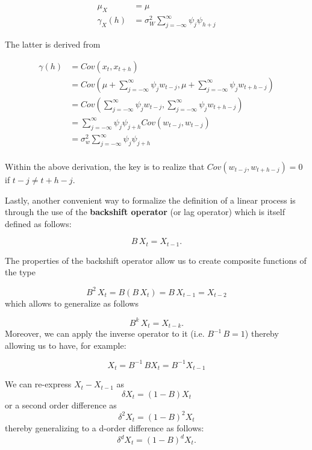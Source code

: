\documentclass[]{book}
\theoremstyle{definition}
\theoremstyle{definition}
\theoremstyle{definition}
\theoremstyle{remark}
\let\BeginKnitrBlock\begin \let\EndKnitrBlock\end
\begin{document}
\[\begin{aligned}
\mu_{X} &= \mu \\
\gamma_{X}(h) &= \sigma _W^2\sum\limits_{j =  - \infty }^\infty  {{\psi _j}{\psi _{h + j}}}
\end{aligned}\]

The latter is derived from

\[\begin{aligned}
  \gamma \left( h \right) &= Cov\left( {{x_t},{x_{t + h}}} \right) \\
   &= Cov\left( {\mu  + \sum\limits_{j =  - \infty }^\infty  {{\psi _j}{w_{t - j}}} ,\mu  + \sum\limits_{j =  - \infty }^\infty  {{\psi _j}{w_{t + h - j}}} } \right) \\
   &= Cov\left( {\sum\limits_{j =  - \infty }^\infty  {{\psi _j}{w_{t - j}}} ,\sum\limits_{j =  - \infty }^\infty  {{\psi _j}{w_{t + h - j}}} } \right) \\
   &= \sum\limits_{j =  - \infty }^\infty  {{\psi _j}{\psi _{j + h}}Cov\left( {{w_{t - j}},{w_{t - j}}} \right)}  \\
   &= \sigma _w^2\sum\limits_{j =  - \infty }^\infty  {{\psi _j}{\psi _{j + h}}}  \\ 
\end{aligned} \]

Within the above derivation, the key is to realize that
\(Cov\left( {{w_{t - j}},{w_{t + h - j}}} \right) = 0\) if
\(t - j \ne t + h - j\).

Lastly, another convenient way to formalize the definition of a linear
process is through the use of the \textbf{backshift operator} (or lag
operator) which is itself defined as follows:

\[B\,X_t = X_{t-1}.\]

The properties of the backshift operator allow us to create composite
functions of the type

\[B^2 \, X_t = B (B \, X_t) = B \, X_{t-1} = X_{t-2}\] which allows to
generalize as follows

\[B^k \, X_t = X_{t-k}.\] Moreover, we can apply the inverse operator to
it (i.e. \(B^{-1} \, B = 1\)) thereby allowing us to have, for example:

\[X_t = B^{-1} \, B X_t = B^{-1} X_{t-1}\]

\BeginKnitrBlock{example}[d-order Differences]
\protect\hypertarget{exm:backdiff}{}{\label{exm:backdiff} {} }We can re-express \(X_t - X_{t-1}\) as
\[\delta X_t = (1 - B) X_t\] or a second order difference as
\[\delta^2 X_t = (1 - B)^2 X_t\] thereby generalizing to a d-order
difference as follows: \[\delta^d X_t = (1 - B)^d X_t.\]
\EndKnitrBlock{example}
\end{document}
